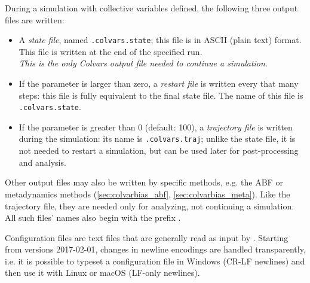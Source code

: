 
During a simulation with collective variables defined, the following three output files are written:

\begin{itemize}

\item A \emph{state file}, named \outputName\texttt{.colvars.state}; this file is in ASCII (plain text) format.  This file is written at the end of the specified run.\\
  \emph{This is the only Colvars output file needed to continue a simulation.}

\item If the parameter  is larger than zero, a \emph{restart file} is written every that many steps: this file is fully equivalent to the final state file.
  The name of this file is \restartName\texttt{.colvars.state}.

\item If the parameter  is greater than 0 (default: 100), a \emph{trajectory file} is written during the simulation: its name is \outputName\texttt{.colvars.traj}; unlike the state file, it is not needed to restart a simulation, but can be used later for post-processing and analysis.

\end{itemize}

Other output files may also be written by specific methods, e.g.{} the ABF or metadynamics methods (\ref{sec:colvarbias_abf}, \ref{sec:colvarbias_meta}).
Like the trajectory file, they are needed only for analyzing, not continuing a simulation.
All such files' names also begin with the prefix \outputName.





Configuration files are text files that are generally read as input by \MDENGINE{}.
Starting from versions 2017-02-01, changes in newline encodings are handled transparently, i.e.{} it is possible to typeset a configuration file in Windows (CR-LF newlines) and then use it with Linux or macOS (LF-only newlines).

